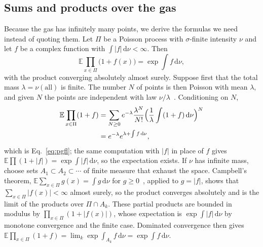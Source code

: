 \documentclass[a4paper,11pt]{article}
\newcommand{\bE}{\mathbb{E}}
\newcommand{\dd}{\mathrm{d}}
\begin{document}
\subsection{Sums and products over the gas}
\label{sec:avg}

Because the gas has infinitely many points, we derive the formulas we need instead of quoting them. Let $\Pi$ be a Poisson process with $\sigma$-finite intensity $\nu$ and let $f$ be a complex function with $\int|f|\,\dd\nu<\infty$. Then
\begin{equation}
\label{eq:pgfl}
\bE\prod_{x\in\Pi}\bigl(1+f(x)\bigr)=\exp\int f\,\dd\nu ,
\end{equation}
with the product converging absolutely almost surely. Suppose first that the total mass $\lambda=\nu(\text{all})$ is finite. The number $N$ of points is then Poisson with mean $\lambda$, and given $N$ the points are independent with law $\nu/\lambda$~\cite{LastPenrose2017}. Conditioning on $N$,
\begin{align*}
\bE\prod_{x\in\Pi}(1+f)&=\sum_{N\ge0}e^{-\lambda}\frac{\lambda^N}{N!}\Bigl(\frac1\lambda\int(1+f)\,\dd\nu\Bigr)^{N}\\
&=e^{-\lambda}e^{\lambda+\int f\,\dd\nu},
\end{align*}
which is Eq.~\eqref{eq:pgfl}; the same computation with $|f|$ in place of $f$ gives $\bE\prod(1+|f|)=\exp\int|f|\,\dd\nu$, so the expectation exists. If $\nu$ has infinite mass, choose sets $A_1\subset A_2\subset\cdots$ of finite measure that exhaust the space. Campbell's theorem, $\bE\sum_{x\in\Pi}g(x)=\int g\,\dd\nu$ for $g\ge0$~\cite{Kingman1993}, applied to $g=|f|$, shows that $\sum_{x\in\Pi}|f(x)|<\infty$ almost surely, so the product converges absolutely and is the limit of the products over $\Pi\cap A_k$. These partial products are bounded in modulus by $\prod_{x\in\Pi}(1+|f(x)|)$, whose expectation is $\exp\int|f|\,\dd\nu$ by monotone convergence and the finite case. Dominated convergence then gives $\bE\prod_{x\in\Pi}(1+f)=\lim_k\exp\int_{A_k}f\,\dd\nu=\exp\int f\,\dd\nu$.
\end{document}
